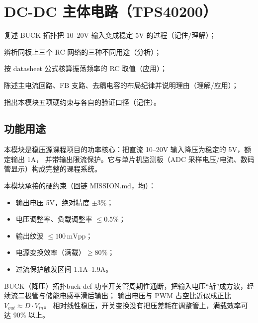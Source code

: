 \chapter{DC-DC 主体电路（TPS40200）}

\begin{introduction}
  \item 复述 BUCK 拓扑把 10--20V 输入变成稳定 5V 的过程（记住/理解）；
  \item 辨析同板上三个 RC 网络的三种不同用途（分析）；
  \item 按 datasheet 公式核算振荡频率的 RC 取值（应用）；
  \item 陈述主电流回路、FB 支路、去耦电容的布局纪律并说明理由（理解/应用）；
  \item 指出本模块五项硬约束与各自的验证口径（记住）。
\end{introduction}

\section{功能用途}

本模块是稳压源课程项目的功率核心：把直流 10--20V 输入降压为稳定的 5V，额定输出 1A，
并带输出限流保护。它与单片机监测板（ADC 采样电压/电流、数码管显示）构成完整的课程系统。

本模块承接的硬约束（回链 MISSION.md，均）：
\begin{itemize}
  \item 输出电压 5V，绝对精度 $\pm 3\%$；
  \item 电压调整率、负载调整率 $\le 0.5\%$；
  \item 输出纹波 $\le 100\,\mathrm{mVpp}$；
  \item 电源变换效率（满载）$\ge 80\%$；
  \item 过流保护触发区间 1.1A--1.9A。
\end{itemize}

\begin{definition}{BUCK（降压）拓扑}{buck-def}
功率开关管周期性通断，把输入电压“斩”成方波，经续流二极管与储能电感平滑后输出；
输出电压与 PWM 占空比近似成正比 $V_{out} \approx D \cdot V_{in}$。
相对线性稳压，开关变换没有把压差耗在调整管上，满载效率可达 90\% 以上。
\end{definition}

